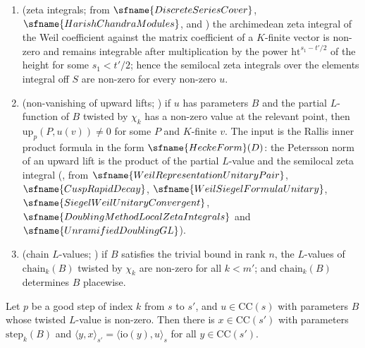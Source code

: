 \begin{enumerate}[label=(O\arabic*)]
$\sfname{CuspRapidDecay}$ and $\sfname{HoweUnram}$) if $u$ has parameters $B$ and $\mathrm{up}_p(P,u(v))\ne0$, it has parameters
$\mathrm{step}_k(B)$.
\item\label{pf:fs:O6} (zeta integrals;  from
$\sfname{DiscreteSeriesCover}$, $\sfname{HarishChandraModules}$, and
) the archimedean zeta integral of the Weil coefficient against
the matrix coefficient of a $K$-finite vector is non-zero and remains integrable after multiplication by the power
$\mathrm{ht}^{s_1-t'/2}$ of the height for some $s_1<t'/2$; hence the semilocal zeta integrals over the elements integral off $S$
are non-zero for every non-zero $u$.
\item\label{pf:fs:O7} (non-vanishing of upward lifts; ) if $u$ has
parameters $B$ and the partial $L$-function of $B$ twisted by $\chi_k$ has a non-zero value at the relevant point, then
$\mathrm{up}_p(P,u(v))\ne0$ for some $P$ and $K$-finite $v$. The input is the Rallis inner product formula in the form
$\sfname{HeckeForm}(D)$: the Petersson norm of an upward lift is the product of the partial $L$-value and the semilocal zeta integral
(, from $\sfname{WeilRepresentationUnitaryPair}$, $\sfname{CuspRapidDecay}$,
$\sfname{WeilSiegelFormulaUnitary}$, $\sfname{SiegelWeilUnitaryConvergent}$, $\sfname{DoublingMethodLocalZetaIntegrals}$ and
$\sfname{UnramifiedDoublingGL}$).
\item\label{pf:fs:O8} (chain $L$-values; ) if $B$ satisfies
the trivial bound in rank $n$, the $L$-values of $\mathrm{chain}_k(B)$ twisted by $\chi_k$ are non-zero for all $k<m'$; and
$\mathrm{chain}_k(B)$ determines $B$ placewise.
\end{enumerate}

\begin{lemma}\label{pf:fs:stepUp}
Let $p$ be a good step of index $k$ from $s$ to $s'$, and $u\in\mathrm{CC}(s)$ with parameters $B$ whose twisted $L$-value is
non-zero. Then there is $x\in\mathrm{CC}(s')$ with parameters $\mathrm{step}_k(B)$ and $\langle y,x\rangle_{s'}=\langle\mathrm{io}(y),u\rangle_s$ for all
$y\in\mathrm{CC}(s')$.
\end{lemma}

